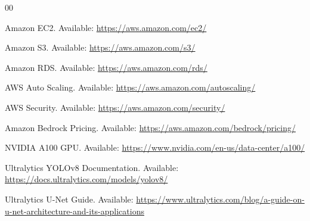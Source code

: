 \documentclass[conference]{IEEEtran}
\begin{document}
	\begin{thebibliography}{00}
		
		Amazon EC2. Available: \url{https://aws.amazon.com/ec2/}
		
		Amazon S3. Available: \url{https://aws.amazon.com/s3/}
		
		Amazon RDS. Available: \url{https://aws.amazon.com/rds/}
		
		AWS Auto Scaling. Available: \url{https://aws.amazon.com/autoscaling/}
		
		AWS Security. Available: \url{https://aws.amazon.com/security/}
		
		Amazon Bedrock Pricing. Available: \url{https://aws.amazon.com/bedrock/pricing/}
		
		NVIDIA A100 GPU. Available: \url{https://www.nvidia.com/en-us/data-center/a100/}
		
		Ultralytics YOLOv8 Documentation. Available: \url{https://docs.ultralytics.com/models/yolov8/}
		
		Ultralytics U-Net Guide. Available: \url{https://www.ultralytics.com/blog/a-guide-on-u-net-architecture-and-its-applications}
		
	\end{thebibliography}
	
\end{document}
